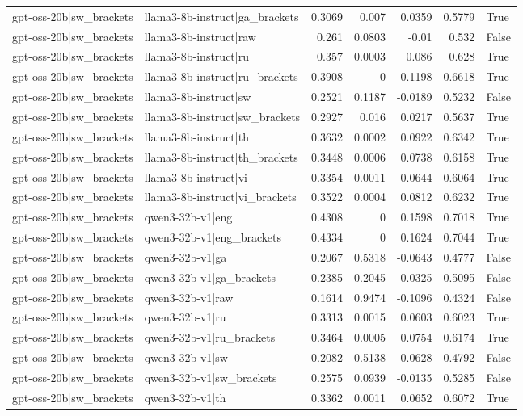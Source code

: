 \begin{table}
\begin{tabular}{l l r r r r l}
gpt-oss-20b|sw_brackets & llama3-8b-instruct|ga_brackets & 0.3069 & 0.007 & 0.0359 & 0.5779 & True \\
gpt-oss-20b|sw_brackets & llama3-8b-instruct|raw & 0.261 & 0.0803 & -0.01 & 0.532 & False \\
gpt-oss-20b|sw_brackets & llama3-8b-instruct|ru & 0.357 & 0.0003 & 0.086 & 0.628 & True \\
gpt-oss-20b|sw_brackets & llama3-8b-instruct|ru_brackets & 0.3908 & 0 & 0.1198 & 0.6618 & True \\
gpt-oss-20b|sw_brackets & llama3-8b-instruct|sw & 0.2521 & 0.1187 & -0.0189 & 0.5232 & False \\
gpt-oss-20b|sw_brackets & llama3-8b-instruct|sw_brackets & 0.2927 & 0.016 & 0.0217 & 0.5637 & True \\
gpt-oss-20b|sw_brackets & llama3-8b-instruct|th & 0.3632 & 0.0002 & 0.0922 & 0.6342 & True \\
gpt-oss-20b|sw_brackets & llama3-8b-instruct|th_brackets & 0.3448 & 0.0006 & 0.0738 & 0.6158 & True \\
gpt-oss-20b|sw_brackets & llama3-8b-instruct|vi & 0.3354 & 0.0011 & 0.0644 & 0.6064 & True \\
gpt-oss-20b|sw_brackets & llama3-8b-instruct|vi_brackets & 0.3522 & 0.0004 & 0.0812 & 0.6232 & True \\
gpt-oss-20b|sw_brackets & qwen3-32b-v1|eng & 0.4308 & 0 & 0.1598 & 0.7018 & True \\
gpt-oss-20b|sw_brackets & qwen3-32b-v1|eng_brackets & 0.4334 & 0 & 0.1624 & 0.7044 & True \\
gpt-oss-20b|sw_brackets & qwen3-32b-v1|ga & 0.2067 & 0.5318 & -0.0643 & 0.4777 & False \\
gpt-oss-20b|sw_brackets & qwen3-32b-v1|ga_brackets & 0.2385 & 0.2045 & -0.0325 & 0.5095 & False \\
gpt-oss-20b|sw_brackets & qwen3-32b-v1|raw & 0.1614 & 0.9474 & -0.1096 & 0.4324 & False \\
gpt-oss-20b|sw_brackets & qwen3-32b-v1|ru & 0.3313 & 0.0015 & 0.0603 & 0.6023 & True \\
gpt-oss-20b|sw_brackets & qwen3-32b-v1|ru_brackets & 0.3464 & 0.0005 & 0.0754 & 0.6174 & True \\
gpt-oss-20b|sw_brackets & qwen3-32b-v1|sw & 0.2082 & 0.5138 & -0.0628 & 0.4792 & False \\
gpt-oss-20b|sw_brackets & qwen3-32b-v1|sw_brackets & 0.2575 & 0.0939 & -0.0135 & 0.5285 & False \\
gpt-oss-20b|sw_brackets & qwen3-32b-v1|th & 0.3362 & 0.0011 & 0.0652 & 0.6072 & True \\

\end{tabular}
\end{table}
